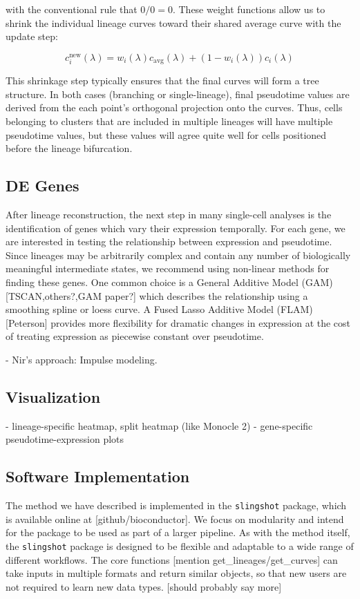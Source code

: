 \documentclass[11pt]{article}\usepackage[]{graphicx}\usepackage[]{color}
\begin{document}
with the conventional rule that $0/0 = 0$. These weight functions allow us to shrink the individual lineage curves toward their shared average curve with the update step:

$$c_i^\text{new}(\lambda) = w_i(\lambda)c_{\text{avg}}(\lambda) + (1-w_i(\lambda))c_i(\lambda)$$

This shrinkage step typically ensures that the final curves will form a tree structure. In both cases (branching or single-lineage), final pseudotime values are derived from the each point’s orthogonal projection onto the curves. Thus, cells belonging to clusters that are included in multiple lineages will have multiple pseudotime values, but these values will agree quite well for cells positioned before the lineage bifurcation.


\subsection{DE Genes}
\label{s:DE}
After lineage reconstruction, the next step in many single-cell analyses is the identification of genes which vary their expression temporally. For each gene, we are interested in testing the relationship between expression and pseudotime. Since lineages may be arbitrarily complex and contain any number of biologically meaningful intermediate states, we recommend using non-linear methods for finding these genes. One common choice is a General Additive Model (GAM) [TSCAN,others?,GAM paper?] which describes the relationship using a smoothing spline or loess curve. A Fused Lasso Additive Model (FLAM) [Peterson] provides more flexibility for dramatic changes in expression at the cost of treating expression as piecewise constant over pseudotime.

- Nir's approach: Impulse modeling. 

\subsection{Visualization}
\label{s:viz}
- lineage-specific heatmap, split heatmap (like Monocle 2)
- gene-specific pseudotime-expression plots


\subsection{Software Implementation}
\label{s:software}
The method we have described is implemented in the \texttt{slingshot} package, which is available online at [github/bioconductor]. We focus on modularity and intend for the package to be used as part of a larger pipeline. As with the method itself, the \texttt{slingshot} package is designed to be flexible and adaptable to a wide range of different workflows. The core functions [mention get\_lineages/get\_curves] can take inputs in multiple formats and return similar objects, so that new users are not required to learn new data types. [should probably say more]
\end{document}
